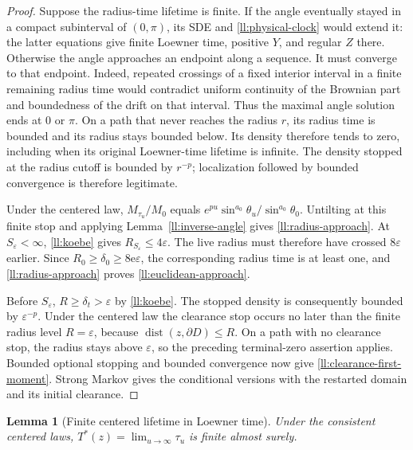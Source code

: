 \documentclass[11pt]{article}
\newtheorem{lemma}[theorem]{Lemma}
\theoremstyle{definition}
\theoremstyle{remark}
\numberwithin{equation}{section}
\begin{document}
\begin{proof}
Suppose the radius-time lifetime is finite.  If the angle eventually
stayed in a compact subinterval of $(0,\pi)$, its SDE and
\eqref{ll:physical-clock} would extend it: the latter equations give
finite Loewner time, positive $Y$, and regular $Z$ there.  Otherwise
the angle approaches an endpoint along a sequence.  It must converge
to that endpoint.  Indeed, repeated crossings of a fixed interior
interval in a finite remaining radius time would contradict uniform
continuity of the Brownian part and boundedness of the drift on that
interval.  Thus the maximal angle solution ends at $0$ or $\pi$.
On a path that never reaches the radius $r$, its radius time is bounded
and its radius stays bounded below.  Its density therefore tends to zero,
including when its original Loewner-time lifetime is infinite.
The density stopped at the radius cutoff is bounded by $r^{-p}$;
localization followed by bounded convergence is therefore legitimate.

Under the centered law, $M_{\tau_u}/M_0$
equals $e^{pu}\sin^{a_0}\theta_u/\sin^{a_0}\theta_0$.
Untilting at this finite stop and applying
Lemma~\ref{ll:inverse-angle} gives \eqref{ll:radius-approach}.
At $S_\varepsilon<\infty$, \eqref{ll:koebe} gives
$R_{S_\varepsilon}\le4\varepsilon$.  The live radius must therefore
have crossed $8\varepsilon$ earlier.  Since
$R_0\ge\delta_0\ge8\mathrm e\varepsilon$, the corresponding radius
time is at least one, and \eqref{ll:radius-approach} proves
\eqref{ll:euclidean-approach}.

Before $S_\varepsilon$, $R\ge\delta_t>\varepsilon$
by \eqref{ll:koebe}. The stopped density is consequently bounded by
$\varepsilon^{-p}$.
Under the centered law the clearance stop occurs no later than the
finite radius level $R=\varepsilon$, because
$\operatorname{dist}(z,\partial D)\le R$.
On a path with no clearance stop, the radius stays above
$\varepsilon$, so the preceding terminal-zero assertion applies.
Bounded optional stopping and bounded convergence now give
\eqref{ll:clearance-first-moment}.  Strong Markov gives the conditional
versions with the restarted domain and its initial clearance.
\end{proof}

\begin{lemma}[Finite centered lifetime in Loewner time]\label{ll:finite-clock}
Under the consistent centered laws, $T^*(z)=\lim_{u\to\infty}\tau_u$
is finite almost surely.
\end{lemma}
\end{document}
